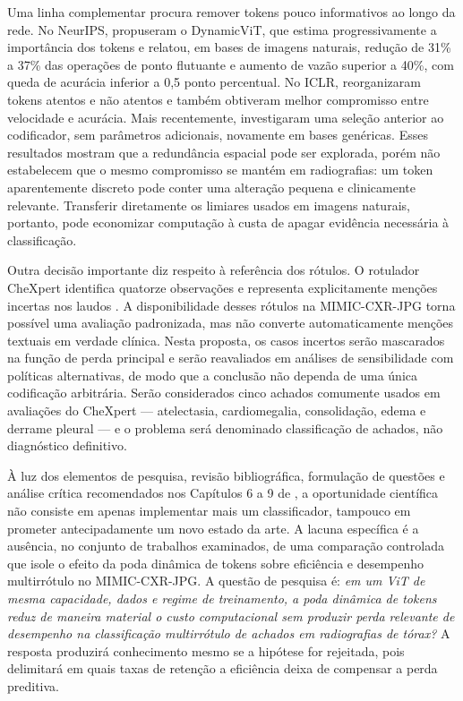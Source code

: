 \documentclass[10pt,a4paper]{extarticle}
\begin{document}
Uma linha complementar procura remover tokens pouco informativos ao longo da rede. No NeurIPS, \citet{rao2021dynamicvit} propuseram o DynamicViT, que estima progressivamente a importância dos tokens e relatou, em bases de imagens naturais, redução de 31\% a 37\% das operações de ponto flutuante e aumento de vazão superior a 40\%, com queda de acurácia inferior a 0,5 ponto percentual. No ICLR, \citet{liang2022evit} reorganizaram tokens atentos e não atentos e também obtiveram melhor compromisso entre velocidade e acurácia. Mais recentemente, \citet{rubab2026dynavit} investigaram uma seleção anterior ao codificador, sem parâmetros adicionais, novamente em bases genéricas. Esses resultados mostram que a redundância espacial pode ser explorada, porém não estabelecem que o mesmo compromisso se mantém em radiografias: um token aparentemente discreto pode conter uma alteração pequena e clinicamente relevante. Transferir diretamente os limiares usados em imagens naturais, portanto, pode economizar computação à custa de apagar evidência necessária à classificação.

Outra decisão importante diz respeito à referência dos rótulos. O rotulador CheXpert identifica quatorze observações e representa explicitamente menções incertas nos laudos \citep{irvin2019chexpert}. A disponibilidade desses rótulos na MIMIC-CXR-JPG torna possível uma avaliação padronizada, mas não converte automaticamente menções textuais em verdade clínica. Nesta proposta, os casos incertos serão mascarados na função de perda principal e serão reavaliados em análises de sensibilidade com políticas alternativas, de modo que a conclusão não dependa de uma única codificação arbitrária. Serão considerados cinco achados comumente usados em avaliações do CheXpert --- atelectasia, cardiomegalia, consolidação, edema e derrame pleural --- e o problema será denominado classificação de achados, não diagnóstico definitivo.

À luz dos elementos de pesquisa, revisão bibliográfica, formulação de questões e análise crítica recomendados nos Capítulos 6 a 9 de \citet{wazlawick2020}, a oportunidade científica não consiste em apenas implementar mais um classificador, tampouco em prometer antecipadamente um novo estado da arte. A lacuna específica é a ausência, no conjunto de trabalhos examinados, de uma comparação controlada que isole o efeito da poda dinâmica de tokens sobre eficiência e desempenho multirrótulo no MIMIC-CXR-JPG. A questão de pesquisa é: \emph{em um ViT de mesma capacidade, dados e regime de treinamento, a poda dinâmica de tokens reduz de maneira material o custo computacional sem produzir perda relevante de desempenho na classificação multirrótulo de achados em radiografias de tórax?} A resposta produzirá conhecimento mesmo se a hipótese for rejeitada, pois delimitará em quais taxas de retenção a eficiência deixa de compensar a perda preditiva.
\end{document}
